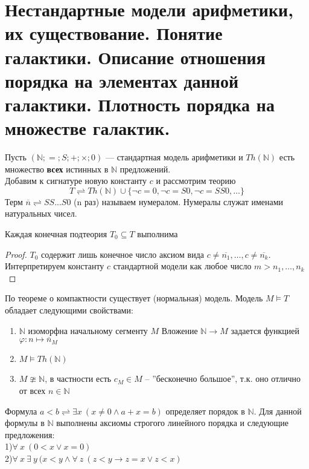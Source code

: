 \section[Нестандартные модели арифметики. Галактики. Порядок на элементах галактики, его плотность.]{\sloppy
Нестандартные модели арифметики, их существование. Понятие галактики. Описание отношения порядка на элементах
данной галактики. Плотность порядка на множестве галактик.}
\begin{example}
	Пусть $(\mathbb{N};=;S;+;\times;0)$ — стандартная модель арифметики и $ Th(\mathbb{N}) $ есть множество
	\textbf{всех} истинных в $\mathbb{N}$ предложений.\\
	Добавим к сигнатуре новую константу $c$ и рассмотрим теорию
		$$T \rightleftharpoons Th(\mathbb{N}) \cup \{\neg c=0,\neg c=S0,\neg c=SS0,\ldots \}$$
	Терм $\overline{n} \rightleftharpoons SS...S0$ (n раз) называем нумералом. Нумералы служат именами натуральных
	чисел. 
\end{example}
\begin{proposition}
	Каждая конечная подтеория $T_0\subseteq T$ выполнима
\end{proposition}
\begin{proof}
	$T_0$ содержит лишь конечное число аксиом вида
	$c \neq \overline{n_1} ,\ldots, c \neq \overline{n_k}$. Интерпретируем константу $c$ стандартной модели как
	любое число $m > n_1,\ldots,n_k$
\end{proof}
По теореме о компактности существует (нормальная) модель. Модель $M\models T$ обладает
следующими свойствами:
\begin{enumerate}
	\item $\mathbb{N}$ изоморфна начальному сегменту $M$
		Вложение $\mathbb{N} \rightarrow M$ задается функцией $\varphi: n \mapsto \overline{n}_M$
	\item $M \models Th(\mathbb{N})$
	\item $M\ncong \mathbb{N}$, в частности есть  $c_M \in M$ -- ''бесконечно большое'', т.к. оно отлично от
		всех $n \in \mathbb{N}$
\end{enumerate}
Формула $a<b\rightleftharpoons \exists x\:( x \neq 0 \wedge  a+x=b)$  определяет порядок в $\mathbb{N}$. Для данной
формулы в $\mathbb{N}$ выполнены аксиомы строгого линейного порядка и следующие предложения:\\
1)$\forall \: x \:(0<x \lor x=0) $\\
2)$\forall \: x \: \exists \: y \: (x<y\wedge \forall \: z\: (z<y\rightarrow z=x \lor z<x)$\\
